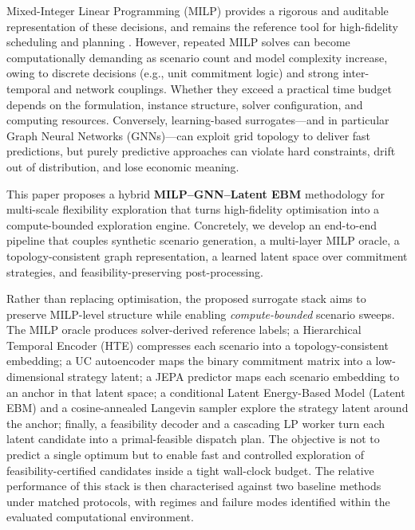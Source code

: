 \documentclass{article}
\let\parencite\citep
\begin{document}
Mixed-Integer Linear Programming (MILP) provides a rigorous and auditable representation of these decisions, and remains the reference tool for high-fidelity scheduling and planning \parencite{conejo_investment_2016}. However, repeated MILP solves can become computationally demanding as scenario count and model complexity increase, owing to discrete decisions (e.g., unit commitment logic) and strong inter-temporal and network couplings. Whether they exceed a practical time budget depends on the formulation, instance structure, solver configuration, and computing resources. Conversely, learning-based surrogates---and in particular Graph Neural Networks (GNNs)---can exploit grid topology to deliver fast predictions, but purely predictive approaches can violate hard constraints, drift out of distribution, and lose economic meaning.

This paper proposes a hybrid \textbf{MILP--GNN--Latent EBM} methodology for multi-scale flexibility exploration that turns high-fidelity optimisation into a compute-bounded exploration engine. Concretely, we develop an end-to-end pipeline that couples synthetic scenario generation, a multi-layer MILP oracle, a topology-consistent graph representation, a learned latent space over commitment strategies, and feasibility-preserving post-processing.

Rather than replacing optimisation, the proposed surrogate stack aims to preserve MILP-level structure while enabling \emph{compute-bounded} scenario sweeps. The MILP oracle produces solver-derived reference labels; a Hierarchical Temporal Encoder (HTE) compresses each scenario into a topology-consistent embedding; a UC autoencoder maps the binary commitment matrix into a low-dimensional strategy latent; a JEPA predictor maps each scenario embedding to an anchor in that latent space; a conditional Latent Energy-Based Model (Latent EBM) and a cosine-annealed Langevin sampler explore the strategy latent around the anchor; finally, a feasibility decoder and a cascading LP worker turn each latent candidate into a primal-feasible dispatch plan. The objective is not to predict a single optimum but to enable fast and controlled exploration of feasibility-certified candidates inside a tight wall-clock budget. The relative performance of this stack is then characterised against two baseline methods under matched protocols, with regimes and failure modes identified within the evaluated computational environment.
\end{document}
